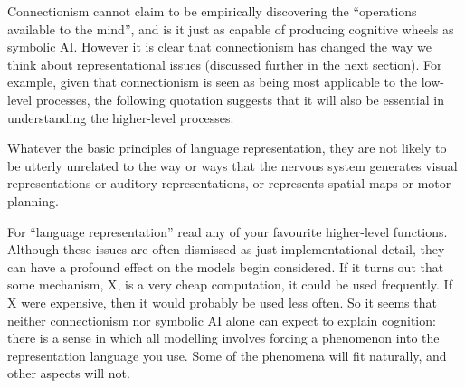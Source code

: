 Connectionism cannot claim to be empirically discovering the ``operations
available to the mind'', and is it just as capable of producing cognitive
wheels as symbolic AI\@. However it is clear that connectionism has changed
the way we think about representational issues (discussed further in the
next section). For example, given that connectionism is seen as being most
applicable to the low-level processes, the following quotation suggests
that it will also be essential in understanding the higher-level processes:
\begin{ssquote}
Whatever the basic principles of language representation, they
are not likely to be utterly unrelated to the way or ways that
the nervous system generates visual representations or auditory
representations, or represents spatial maps or motor planning.

\hfill \cite[p.~42]{churneur}
\end{ssquote}
For ``language representation'' read any of your favourite higher-level
functions.  Although these issues are often dismissed as just
implementational
detail, they can have a profound effect on the models begin considered.
If it turns out that some mechanism, X, is a very cheap computation, it
could be used frequently. If X were expensive, then it would probably be
used less often.  So it seems that neither connectionism nor symbolic AI
alone can expect to explain cognition: there is a sense in which all
modelling involves forcing a phenomenon
into the representation language you
use. Some of the phenomena will fit naturally, and other aspects will not.




